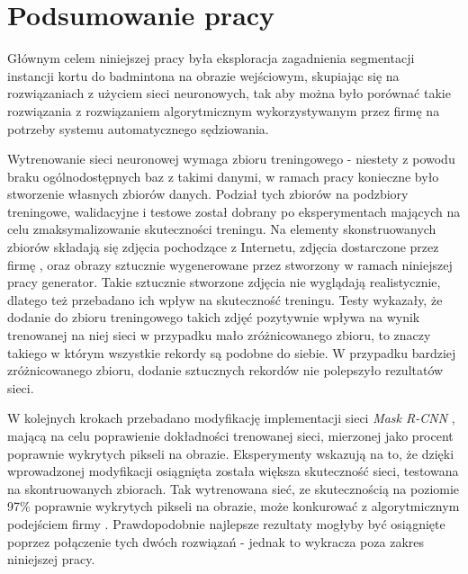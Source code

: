 \chapter{Podsumowanie pracy}

Głównym celem niniejszej pracy była eksploracja zagadnienia segmentacji instancji kortu do badmintona na obrazie wejściowym, skupiając się na rozwiązaniach z użyciem sieci neuronowych, tak aby można było porównać takie rozwiązania z rozwiązaniem algorytmicznym wykorzystywanym przez firmę \blue{} na potrzeby systemu automatycznego sędziowania.

Wytrenowanie sieci neuronowej wymaga zbioru treningowego - niestety z powodu braku ogólnodostępnych baz z takimi danymi, w ramach pracy konieczne było stworzenie własnych zbiorów danych. Podział tych zbiorów na podzbiory treningowe, walidacyjne i testowe został dobrany po eksperymentach mających na celu zmaksymalizowanie skuteczności treningu. Na elementy skonstruowanych zbiorów składają się zdjęcia pochodzące z Internetu, zdjęcia dostarczone przez firmę \blue{}, oraz obrazy sztucznie wygenerowane przez stworzony w ramach niniejszej pracy generator. Takie sztucznie stworzone zdjęcia nie wyglądają realistycznie, dlatego też przebadano ich wpływ na skuteczność treningu. Testy wykazały, że dodanie do zbioru treningowego takich zdjęć pozytywnie wpływa na wynik trenowanej na niej sieci w przypadku mało zróżnicowanego zbioru, to znaczy takiego w którym wszystkie rekordy są podobne do siebie. W przypadku bardziej zróżnicowanego zbioru, dodanie sztucznych rekordów nie polepszyło rezultatów sieci.

W kolejnych krokach przebadano modyfikację implementacji sieci \textit{Mask R-CNN} \cite{matterport-mask-rcnn}, mającą na celu poprawienie dokładności trenowanej sieci, mierzonej jako procent poprawnie wykrytych pikseli na obrazie. Eksperymenty wskazują na to, że dzięki wprowadzonej modyfikacji osiągnięta została większa skuteczność sieci, testowana na skontruowanych zbiorach. Tak wytrenowana sieć, ze skutecznością na poziomie 97\% poprawnie wykrytych pikseli na obrazie, może konkurować z algorytmicznym podejściem firmy \blue{}. Prawdopodobnie najlepsze rezultaty mogłyby być osiągnięte poprzez połączenie tych dwóch rozwiązań - jednak to wykracza poza zakres niniejszej pracy.

